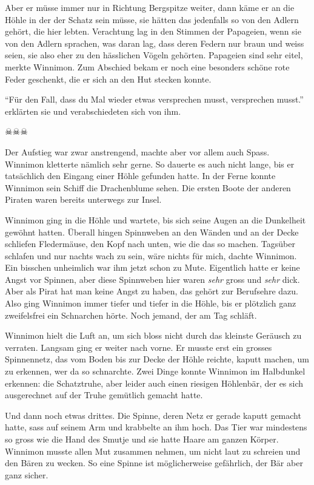 Aber er müsse immer nur in Richtung Bergspitze weiter, dann käme er an die Höhle in der der Schatz sein müsse, sie hätten das jedenfalls so von den Adlern gehört, die hier lebten. Verachtung lag in den Stimmen der Papageien, wenn sie von den Adlern sprachen, was daran lag, dass deren Federn nur braun und weiss seien, sie also eher zu den hässlichen Vögeln gehörten. Papageien sind sehr eitel, merkte Winnimon. Zum Abschied bekam er noch eine besonders schöne rote Feder geschenkt, die er sich an den Hut stecken konnte. 

\enquote{Für den Fall, dass du Mal wieder etwas versprechen musst, versprechen musst.} erklärten sie und verabschiedeten sich von ihm.

\begin{center}
{\color{DeepPink} $\skull \skull \skull$}
\end{center}

Der Aufstieg war zwar anstrengend, machte aber vor allem auch Spass. Winnimon kletterte nämlich sehr gerne. So dauerte es auch nicht lange, bis er tatsächlich den Eingang einer Höhle gefunden hatte. In der Ferne konnte Winnimon sein Schiff die Drachenblume sehen. Die ersten Boote der anderen Piraten waren bereits unterwegs zur Insel.

Winnimon ging in die Höhle und wartete, bis sich seine Augen an die Dunkelheit gewöhnt hatten. Überall hingen Spinnweben an den Wänden und an der Decke schliefen Fledermäuse, den Kopf nach unten, wie die das so machen. Tagsüber schlafen und nur nachts wach zu sein, wäre nichts für mich, dachte Winnimon. Ein bisschen unheimlich war ihm jetzt schon zu Mute. Eigentlich hatte er keine Angst vor Spinnen, aber diese Spinnweben hier waren \emph{sehr} gross und \emph{sehr} dick. Aber als Pirat hat man keine Angst zu haben, das gehört zur Berufsehre dazu. Also ging Winnimon immer tiefer und tiefer in die Höhle, bis er plötzlich ganz zweifelsfrei ein Schnarchen hörte. Noch jemand, der am Tag schläft.

Winnimon hielt die Luft an, um sich bloss nicht durch das kleinste Geräusch zu verraten. Langsam ging er weiter nach vorne. Er musste erst ein grosses Spinnennetz, das vom Boden bis zur Decke der Höhle reichte, kaputt machen, um zu erkennen, wer da so schnarchte. Zwei Dinge konnte Winnimon im Halbdunkel erkennen: die Schatztruhe, aber leider auch einen riesigen Höhlenbär, der es sich ausgerechnet auf der Truhe gemütlich gemacht hatte.

Und dann noch etwas drittes. Die Spinne, deren Netz er gerade kaputt gemacht hatte, sass auf seinem Arm und krabbelte an ihm hoch. Das Tier war mindestens so gross wie die Hand des Smutje und sie hatte Haare am ganzen Körper. Winnimon musste allen Mut zusammen nehmen, um nicht laut zu schreien und den Bären zu wecken. So eine Spinne ist möglicherweise gefährlich, der Bär aber ganz sicher.


